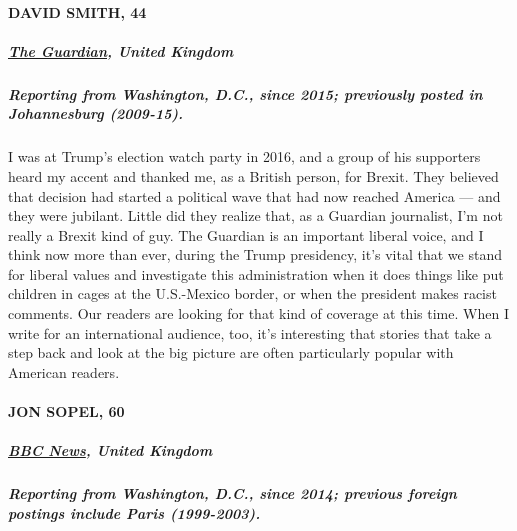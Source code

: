 \hypertarget{david-smith-44}{%
\paragraph{DAVID SMITH, 44}\label{david-smith-44}}

\hypertarget{the-guardian-united-kingdom}{%
\subparagraph{\texorpdfstring{\textbf{\href{https://www.theguardian.com/us}{The
Guardian}, United
Kingdom}}{The Guardian, United Kingdom}}\label{the-guardian-united-kingdom}}

\hypertarget{reporting-from-washington-dc-since-2015-previously-posted-in-johannesburg-2009-15}{%
\subparagraph{\texorpdfstring{\textbf{Reporting from Washington, D.C.,
since 2015; previously posted in Johannesburg
(2009-15).}}{Reporting from Washington, D.C., since 2015; previously posted in Johannesburg (2009-15).}}\label{reporting-from-washington-dc-since-2015-previously-posted-in-johannesburg-2009-15}}

I was at Trump's election watch party in 2016, and a group of his
supporters heard my accent and thanked me, as a British person, for
Brexit. They believed that decision had started a political wave that
had now reached America --- and they were jubilant. Little did they
realize that, as a Guardian journalist, I'm not really a Brexit kind of
guy. The Guardian is an important liberal voice, and I think now more
than ever, during the Trump presidency, it's vital that we stand for
liberal values and investigate this administration when it does things
like put children in cages at the U.S.-Mexico border, or when the
president makes racist comments. Our readers are looking for that kind
of coverage at this time. When I write for an international audience,
too, it's interesting that stories that take a step back and look at the
big picture are often particularly popular with American readers.

\hypertarget{jon-sopel-60}{%
\paragraph{JON SOPEL, 60}\label{jon-sopel-60}}

\hypertarget{bbc-news-united-kingdom-1}{%
\subparagraph{\texorpdfstring{\textbf{\href{https://www.bbc.com/news/correspondents/jonsopel}{BBC
News}, United
Kingdom}}{BBC News, United Kingdom}}\label{bbc-news-united-kingdom-1}}

\hypertarget{reporting-from-washington-dc-since-2014-previous-foreign-postings-include-paris-1999-2003}{%
\subparagraph{\texorpdfstring{\textbf{Reporting from Washington, D.C.,
since 2014; previous foreign postings include Paris
(1999-2003).}}{Reporting from Washington, D.C., since 2014; previous foreign postings include Paris (1999-2003).}}\label{reporting-from-washington-dc-since-2014-previous-foreign-postings-include-paris-1999-2003}}

